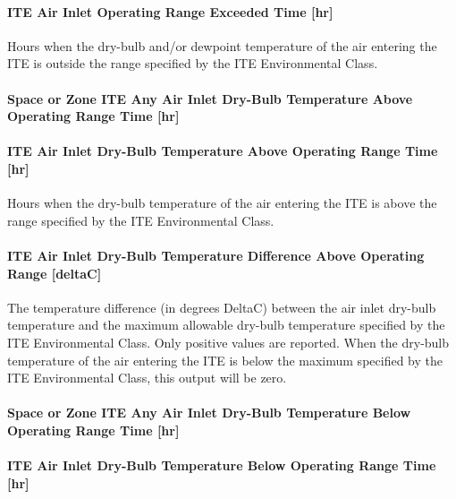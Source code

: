 \paragraph{ITE Air Inlet Operating Range Exceeded Time {[}hr{]}}\label{ite-air-inlet-operating-range-exceeded-time-hr}

Hours when the dry-bulb and/or dewpoint temperature of the air entering the ITE is outside the range specified by the ITE Environmental Class.

\paragraph{Space or Zone ITE Any Air Inlet Dry-Bulb Temperature Above Operating Range Time {[}hr{]}}\label{zone-ite-any-air-inlet-dry-bulb-temperature-above-operating-range-time-hr}

\paragraph{ITE Air Inlet Dry-Bulb Temperature Above Operating Range Time {[}hr{]}}\label{ite-air-inlet-dry-bulb-temperature-above-operating-range-time-hr}

Hours when the dry-bulb temperature of the air entering the ITE is above the range specified by the ITE Environmental Class.

\paragraph{ITE Air Inlet Dry-Bulb Temperature Difference Above Operating Range {[}deltaC{]}}\label{ite-air-inlet-dry-bulb-temperature-difference-above-operating-range-deltac}

The temperature difference (in degrees DeltaC) between the air inlet dry-bulb temperature and the maximum allowable dry-bulb temperature specified by the ITE Environmental Class. Only positive values are reported. When the dry-bulb temperature of the air entering the ITE is below the maximum specified by the ITE Environmental Class, this output will be zero.

\paragraph{Space or Zone ITE Any Air Inlet Dry-Bulb Temperature Below Operating Range Time {[}hr{]}}\label{zone-ite-any-air-inlet-dry-bulb-temperature-below-operating-range-time-hr}

\paragraph{ITE Air Inlet Dry-Bulb Temperature Below Operating Range Time {[}hr{]}}\label{ite-air-inlet-dry-bulb-temperature-below-operating-range-time-hr}


